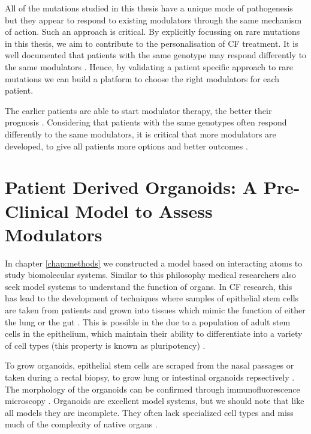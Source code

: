 
All of the mutations studied in this thesis have a unique mode of pathogenesis but they appear to respond to existing modulators through the same mechanism of action. Such an approach is critical. By explicitly focussing on rare mutations in this thesis, we aim to contribute to the personalisation of CF treatment. It is well documented that patients with the same genotype may respond differently to the same modulators \cite{hanafin2021}. Hence, by validating a patient specific approach to rare mutations we can build a platform to choose the right modulators for each patient. 

The earlier patients are able to start modulator therapy, the better their prognosis \cite{lahiri2022}. Considering that patients with the same genotypes often respond differently to the same modulators, it is critical that more modulators are developed, to give all patients more options and better outcomes \cite{hanafin2021}.

\section{Patient Derived Organoids: A Pre-Clinical Model to Assess Modulators}
In chapter \ref{chap:methods} we constructed a model based on interacting atoms to study biomolecular systems. Similar to this philosophy medical researchers also seek model systems to understand the function of organs. In CF research, this has lead to the development of techniques where samples of epithelial stem cells are taken from patients and grown into tissues which mimic the function of either the lung or the gut \cite{wong2015,depoel2020}. This is possible in the due to a population of adult stem cells in the epithelium, which maintain their ability to differentiate into a variety of cell types (this property is known as pluripotency) \cite{blanpain2007}. 

To grow organoids, epithelial stem cells are scraped from the nasal passages or taken during a rectal biopsy, to grow lung or intestinal organoids repsectively  \cite{awatade2021,sato2011}. The morphology of the organoids can be confirmed through immunofluorescence microscopy \cite{awatade2021, im2019}. Organoids are excellent model systems, but we should note that like all models they are incomplete. They often lack specialized cell types and miss much of the complexity of native organs \cite{clevers2016}. 


